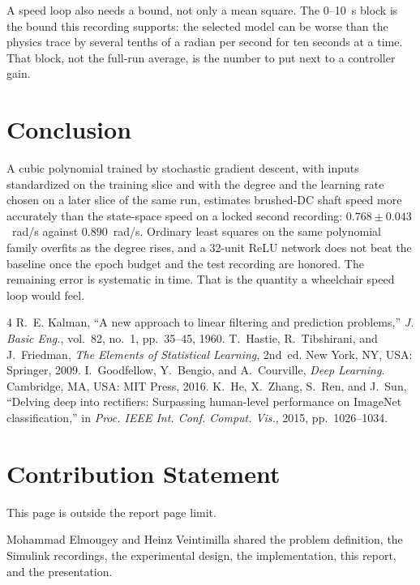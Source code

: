 \documentclass[conference]{IEEEtran}
\begin{document}
A speed loop also needs a bound, not only a mean square. The 0--10~s block is the bound this recording supports: the selected model can be worse than the physics trace by several tenths of a radian per second for ten seconds at a time. That block, not the full-run average, is the number to put next to a controller gain.

\section{Conclusion}
A cubic polynomial trained by stochastic gradient descent, with inputs standardized on the training slice and with the degree and the learning rate chosen on a later slice of the same run, estimates brushed-DC shaft speed more accurately than the state-space speed on a locked second recording: $0.768 \pm 0.043$~rad/s against $0.890$~rad/s. Ordinary least squares on the same polynomial family overfits as the degree rises, and a 32-unit ReLU network does not beat the baseline once the epoch budget and the test recording are honored. The remaining error is systematic in time. That is the quantity a wheelchair speed loop would feel.

\begin{thebibliography}{4}
R.~E. Kalman, ``A new approach to linear filtering and prediction problems,'' \emph{J. Basic Eng.}, vol.~82, no.~1, pp.~35--45, 1960.
T.~Hastie, R.~Tibshirani, and J.~Friedman, \emph{The Elements of Statistical Learning}, 2nd~ed. New York, NY, USA: Springer, 2009.
I.~Goodfellow, Y.~Bengio, and A.~Courville, \emph{Deep Learning}. Cambridge, MA, USA: MIT Press, 2016.
K.~He, X.~Zhang, S.~Ren, and J.~Sun, ``Delving deep into rectifiers: Surpassing human-level performance on ImageNet classification,'' in \emph{Proc. IEEE Int. Conf. Comput. Vis.}, 2015, pp.~1026--1034.
\end{thebibliography}

\clearpage
\onecolumn
\section*{Contribution Statement}
This page is outside the report page limit.

Mohammad Elmougey and Heinz Veintimilla shared the problem definition, the Simulink recordings, the experimental design, the implementation, this report, and the presentation.
\end{document}
